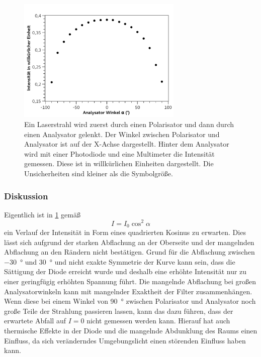 \documentclass[
	a4paper,
	12pt,
	pagesize,
	ngerman
]{scrartcl}
\begin{document}
	\begin{figure}[H]
		\includegraphics[width=0.7\textwidth]{fig_Malus1}
		\centering
		\caption{Ein Laserstrahl wird zuerst durch einen Polarisator und dann durch einen Analysator gelenkt. 
		Der Winkel zwischen Polarisator und Analysator ist auf der X-Achse dargestellt. 
		Hinter dem Analysator wird mit einer Photodiode und eine Multimeter die Intensität gemessen. 
		Diese ist in willkürlichen Einheiten dargestellt. 
		Die Unsicherheiten sind kleiner als die Symbolgröße.} 
		\label{fig_Malus1}
		\centering
	\end{figure}

	\subsubsection{Diskussion}
	
	Eigentlich ist in \cref{fig_Malus1} gemäß
	\begin{equation}
		I = I_0 \cos^2 \alpha
		\label{eq_malus}
	\end{equation}
	ein Verlauf der Intensität in Form eines quadrierten Kosinus zu erwarten.
	Dies lässt sich aufgrund der starken Abflachung an der Oberseite und der mangelnden Abflachung an den Rändern nicht bestätigen.
	Grund für die Abflachung zwischen \SI{-30}{\degree} und \SI{30}{\degree} und nicht exakte Symmetrie der Kurve kann sein, dass die Sättigung der Diode erreicht wurde und deshalb eine erhöhte Intensität nur zu einer geringfügig erhöhten Spannung führt.
	Die mangelnde Abflachung bei großen Analysatorwinkeln kann mit mangelnder Exaktheit der Filter zusammenhängen.
	Wenn diese bei einem Winkel von \SI{90}{\degree} zwischen Polarisator und Analysator noch große Teile der Strahlung passieren lassen, kann das dazu führen, dass der erwartete Abfall auf $I = 0$ nicht gemessen werden kann.
	Hierauf hat auch thermische Effekte in der Diode und die mangelnde Abdunklung des Raums einen Einfluss, da sich veränderndes Umgebungslicht einen störenden Einfluss haben kann. %
	
\end{document}
